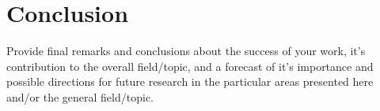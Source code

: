 \chapter{Conclusion}\label{chap:conclusion}

Provide final remarks and conclusions about the success of your work, it's contribution to the overall field/topic, and a forecast of it's importance and possible directions for future research in the particular areas presented here and/or the general field/topic.
\endinput
